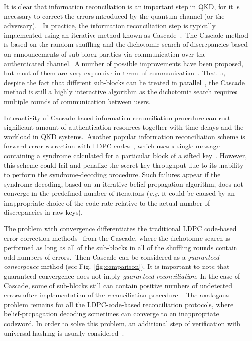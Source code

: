 \documentclass[aps,pra,twocolumn,amsmath,amssymb,nofootinbib,showpacs,superscriptaddress]{revtex4-1}
\begin{document}
It is clear that information reconciliation is an important step in QKD, for it is necessary to correct the errors introduced by the quantum channel (or the adversary).
~In practice, 
the information reconciliation step is typically implemented using an iterative method known as Cascade~\cite{Cascade1_orig}.~The Cascade 
method is based on the random shuffling and the dichotomic search of discrepancies based on announcements of sub-block parities via communication over the authenticated channel.~A number 
of possible improvements have been proposed, but most of them are very expensive in terms of communication~\cite{Cascade2_rev}.
That is, despite the fact that different sub-blocks can be treated in parallel~\cite{Cascade3_par}, 
the Cascade method is still a highly interactive algorithm as the dichotomic search requires multiple rounds of communication between users.

Interactivity of Cascade-based information reconciliation procedure can cost significant amount of authentication resources together with time delays and the workload in QKD systems.~Another popular information reconciliation scheme is forward error correction with LDPC codes~\cite{LDPC_orig1,LDPC_orig2}, which uses a single message containing a syndrome calculated for a particular block of a sifted key~\cite{LDPC1_prop,LDPC2_poly,LDPC3_something,LDPC4_adapt1,LDPC4_adapt2}.
However, this scheme could fail and penalize the secret key throughput due to its inability to perform the syndrome-decoding procedure.
Such failures appear if the syndrome decoding, based on an iterative belief-propagation algorithm, does not converge in the predefined number of iterations 
(\emph{e.g.} it could be caused by an inappropriate choice of the code rate relative to the actual number of discrepancies in raw keys).

The problem with convergence differentiates the traditional LDPC code-based error correction methods~\cite{LDPC_orig1,LDPC_orig2} from the Cascade, 
where the dichotomic search is performed as long as all of the sub-blocks in all of the shuffling rounds contain odd numbers of errors.~Then Cascade can be considered as a \emph{guaranteed-convergence} method (see Fig.~\ref{fig:comparison}).
It is important to note that guaranteed convergence does not imply \emph{guaranteed reconciliation}.
In the case of Cascade, some of sub-blocks still can contain positive numbers of undetected errors after implementation of the reconciliation procedure~\cite{Cascade2_rev}.
The analogous problem remains for all the LDPC-code-based reconciliation protocols, where belief-propagation decoding sometimes can converge to an inappropriate codeword.
In order to solve this problem, an additional step of verification with universal hashing is usually considered~\cite{Gisin2,ChiHang}.
\end{document}
